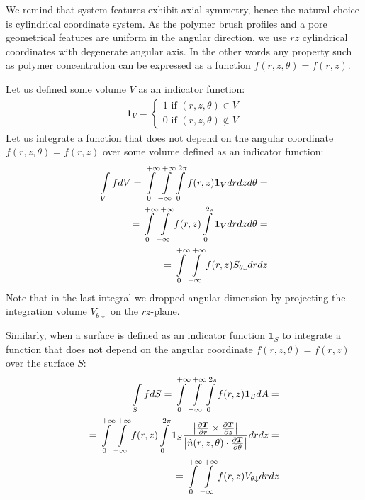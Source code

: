 \documentclass[10pt, a4paper]{article}
\begin{document}
\begin{multicols}{2}
We remind that system features exhibit axial symmetry, hence the natural choice is cylindrical coordinate system.
As the polymer brush profiles and a pore geometrical features are uniform in the angular direction, we use $rz$ cylindrical coordinates with degenerate angular axis. In the other words any property such as polymer concentration can be expressed as a function
$f(r,z, \theta) = f(r,z)$.

Let us defined some volume $V$ as an indicator function:
\begin{eqnarray}
    \bm{1}_V =
    \begin{cases}
        1 \textrm{ if } (r,z,\theta) \in V\\
        0 \textrm{ if } (r,z,\theta) \notin  V
    \end{cases}
\end{eqnarray}
Let us integrate a function that does not depend on the angular coordinate $f(r,z, \theta) = f(r,z)$ over some volume defined as an indicator function:
\begin{eqnarray}
    \begin{split}
        \int\limits_{V} f dV
        =\int\displaylimits_{0}^{+\infty} \int\displaylimits_{-\infty}^{+\infty} \int\displaylimits_{0}^{2\pi} f(r, z) \bm{1}_V  dr dz d\theta =\\
        =\int\displaylimits_{0}^{+\infty} \int\displaylimits_{-\infty}^{+\infty} f(r, z) \int\displaylimits_{0}^{2\pi}  \bm{1}_V dr dz d\theta =\\
        =\int\displaylimits_{0}^{+\infty} \int\displaylimits_{-\infty}^{+\infty} f(r, z)  S_{\theta \downarrow} dr dz
    \end{split}
\end{eqnarray}
Note that in the last integral we dropped angular dimension by projecting the integration volume $V_{\theta \downarrow}$ on the $rz$-plane.

Similarly, when a surface is defined as an indicator function $\bm{1}_S$ to integrate a function that does not depend on the angular coordinate $f(r,z, \theta) = f(r,z)$ over the surface $S$:
\begin{eqnarray}
    \begin{split}
        \int\limits_{S} f dS = \int\displaylimits_{0}^{+\infty} \int\displaylimits_{-\infty}^{+\infty} \int\displaylimits_{0}^{2\pi} f(r, z) \bm{1}_S  dA =\\
        =\int\displaylimits_{0}^{+\infty} \int\displaylimits_{-\infty}^{+\infty} f(r, z) \int\displaylimits_{0}^{2\pi}  \bm{1}_S  \frac{\left|\frac{\partial \bm{T}}{\partial r} \times \frac{\partial \bm{T}}{\partial z} \right|}{\left|\hat{n}(r, z, \theta) \cdot \frac{\partial\bm{T}}{\partial \theta}\right|} dr dz =\\
        =\int\displaylimits_{0}^{+\infty} \int\displaylimits_{-\infty}^{+\infty} f(r, z)  V_{\theta \downarrow} dr dz
    \end{split}
\end{eqnarray}


\end{multicols}
\end{document}

